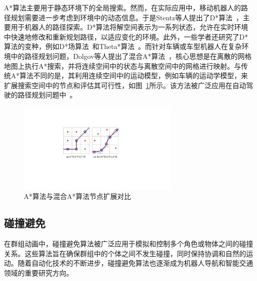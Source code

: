 A*算法主要用于静态环境下的全局搜索。然而，在实际应用中，移动机器人的路径规划需要进一步考虑到环境中的动态信息。于是Stentz等人提出了D*算法~\cite{stentz1994optimal}，主要用于机器人的路径探索。D*算法将解空间表示为一系列状态，允许在实时环境中快速地修改和重新规划路径，以适应变化的环境。此外，一些学者还研究了D*算法的变种，例如D*场算法~\cite{ferguson2006using}和Theta*算法~\cite{daniel2010theta, xiao2014improved}。而针对车辆或车型机器人在复杂环境中的路径规划问题，Dolgov等人提出了混合A*算法~\cite{dolgov2008practical}，核心思想是在离散的网格地图上执行A*搜索，并将连续空间中的状态与离散空间中的网格进行映射。与传统A*算法不同的是，其利用连续空间中的运动模型，例如车辆的运动学模型，来扩展搜索空间中的节点和评估其可行性，如图~\ref{fig:intro_hybridAstar}所示。该方法被广泛应用在自动驾驶的路径规划问题中~\cite{sedighi2019guided, dang2022improved}。

\begin{figure}[!tbh]
\centering
\includegraphics[width=0.7\textwidth]{figure/intro/hybridAstar.pdf}
\caption[A*算法与混合A*算法节点扩展对比]{
A*算法与混合A*算法节点扩展对比
}
\label{fig:intro_hybridAstar}
\end{figure}


\subsection{碰撞避免}

在群组动画中，碰撞避免算法被广泛应用于模拟和控制多个角色或物体之间的碰撞关系。这些算法旨在确保群组中的个体之间不发生碰撞，同时保持协调和自然的运动。随着自动化技术的不断进步，碰撞避免算法也逐渐成为机器人导航和智能交通领域的重要研究方向。

